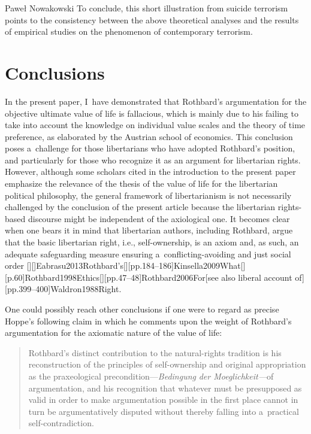 \begin{artengenv}{Paweł Nowakowski}
To conclude, this short illustration from suicide terrorism points to the consistency between the above theoretical analyses and the results of empirical studies on the phenomenon of contemporary terrorism.



\section{Conclusions}

In the present paper, I~have demonstrated that Rothbard's argumentation for the objective ultimate value of life is fallacious, which is mainly due to his failing to take into account the knowledge on individual value scales and the theory of time preference, as elaborated by the Austrian school of economics. This conclusion poses a~challenge for those libertarians who have adopted Rothbard's position, and particularly for those who recognize it as an argument for libertarian rights. However, although some scholars cited in the introduction to the present paper emphasize the relevance of the thesis of the value of life for the libertarian political philosophy, the general framework of libertarianism is not necessarily challenged by the conclusion of the present article because the libertarian rights-based discourse might be independent of the axiological one. It becomes clear when one bears it in mind that libertarian authors, including Rothbard, argue that the basic libertarian right, i.e., self-ownership, is an axiom and, as such, an adequate safeguarding measure ensuring a~conflicting-avoiding and just social order 
\parencites[see, e.g.,][p.736]{Child1994Can}[][]{Eabrasu2013Rothbard’s}[][pp.184–186]{Kinsella2009What}[][p.60]{Rothbard1998Ethics}[][pp.47–48]{Rothbard2006For}[see also liberal account of][pp.399–400]{Waldron1988Right}.%




One could possibly reach other conclusions if one were to regard as precise Hoppe's 
\parencite*[][p.xxxiv]{Hoppe1998Introduction} %
 following claim in which he comments upon the weight of Rothbard's argumentation for the axiomatic nature of the value of life:



\begin{quote}
Rothbard's distinct contribution to the natural-rights tradition is his reconstruction of the principles of self-ownership and original appropriation as the praxeological precondition---\textit{Bedingung} \textit{der Moeglichkeit---}of argumentation, and his recognition that whatever must be presupposed as valid in order to make argumentation possible in the first place cannot in turn be argumentatively disputed without thereby falling into a~practical self-contradiction.
\end{quote}




\end{artengenv}
